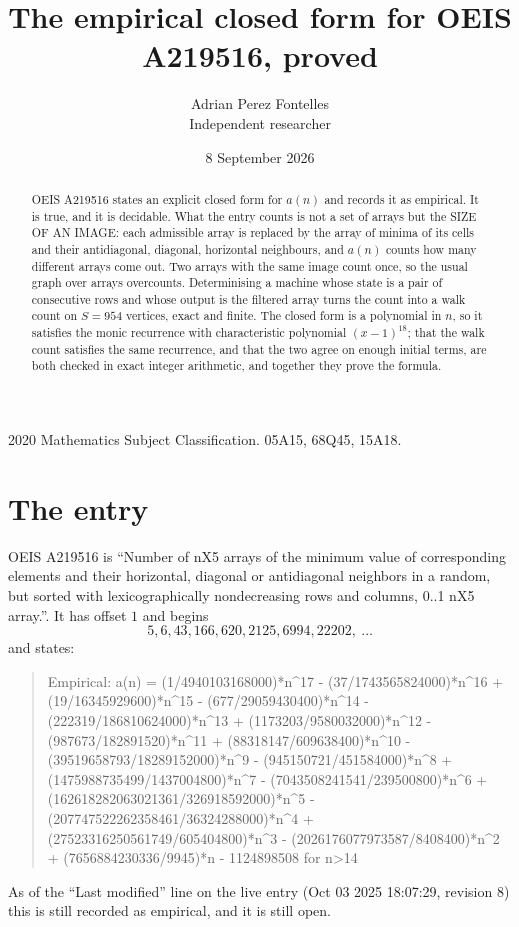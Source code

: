 \documentclass[11pt,a4paper]{article}
\title{The empirical closed form for OEIS A219516, proved}
\author{Adrian Perez Fontelles\\ \small Independent researcher}
\date{8 September 2026}
\theoremstyle{plain}
\theoremstyle{definition}
\begin{document}
\maketitle

\begin{abstract}
OEIS A219516 states an explicit closed form for $a(n)$ and records it as empirical. It is true, and
it is decidable. What the entry counts is not a set of arrays but the SIZE OF AN IMAGE: each
admissible array is replaced by the array of minima of its cells and their antidiagonal, diagonal, horizontal neighbours,
and $a(n)$ counts how many different arrays come out. Two arrays with the same image count
once, so the usual graph over arrays overcounts. Determinising a machine whose state is a pair
of consecutive rows and whose output is the filtered array turns the count into a walk count on
$S=954$ vertices, exact and finite. The closed form is a polynomial in $n$, so it satisfies the
monic recurrence with characteristic polynomial $(x-1)^{18}$; that the walk count
satisfies the same recurrence, and that the two agree on enough initial terms, are both checked
in exact integer arithmetic, and together they prove the formula.
\end{abstract}

\noindent\small 2020 Mathematics Subject Classification. 05A15, 68Q45, 15A18.\normalsize

\section{The entry}

OEIS A219516 is ``Number of nX5 arrays of the minimum value of corresponding elements and their horizontal, diagonal or antidiagonal neighbors in a random, but sorted with lexicographically nondecreasing rows and columns, 0..1 nX5 array.''. It has offset $1$ and begins
\[
5, 6, 43, 166, 620, 2125, 6994, 22202,\ \dots
\]
and states:
\begin{quote}
Empirical: a(n) = (1/4940103168000)*n\^{}17 - (37/1743565824000)*n\^{}16 + (19/16345929600)*n\^{}15 - (677/29059430400)*n\^{}14 - (222319/186810624000)*n\^{}13 + (1173203/9580032000)*n\^{}12 - (987673/182891520)*n\^{}11 + (88318147/609638400)*n\^{}10 - (39519658793/18289152000)*n\^{}9 - (945150721/451584000)*n\^{}8 + (1475988735499/1437004800)*n\^{}7 - (7043508241541/239500800)*n\^{}6 + (162618282063021361/326918592000)*n\^{}5 - (207747522262358461/36324288000)*n\^{}4 + (27523316250561749/605404800)*n\^{}3 - (2026176077973587/8408400)*n\^{}2 + (7656884230336/9945)*n - 1124898508 for n>14
\end{quote}
As of the ``Last modified'' line on the live entry (Oct 03 2025 18:07:29, revision 8)
this is still recorded as empirical, and it is still open.
\end{document}
